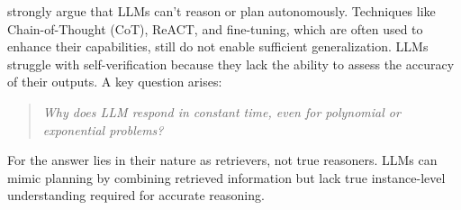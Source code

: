 \textcite{subbarao2024canlanguagemodelsreasonplan, kambhampati2024llmscantplanhelp} strongly argue that LLMs can't reason or plan autonomously.
Techniques like Chain-of-Thought (CoT), ReACT, and fine-tuning, which are often used to enhance their capabilities, still do not enable sufficient generalization.
LLMs struggle with self-verification because they lack the ability to assess the accuracy of their outputs.
A key question arises:
\begin{quote}
	\textit{Why does LLM respond in constant time, even for polynomial or exponential problems?}
\end{quote}
For \textcite{subbarao2024canlanguagemodelsreasonplan, kambhampati2024llmscantplanhelp} the answer lies in their nature as retrievers, not true reasoners.
LLMs can mimic planning by combining retrieved information but lack true instance-level understanding required for accurate reasoning.
